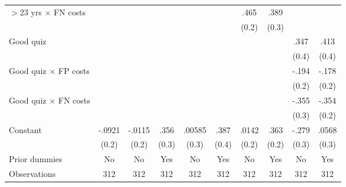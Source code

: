 \begin{table}[htbp]
\begin{tabular}{l*{9}{c}}
$>$23 yrs $\times$ FN costs&                  &                  &                  &                  &                  &     .465\sym{**} &     .389         &                  &                  \\
                &                  &                  &                  &                  &                  &    (0.2)         &    (0.3)         &                  &                  \\
Good quiz       &                  &                  &                  &                  &                  &                  &                  &     .347         &     .413         \\
                &                  &                  &                  &                  &                  &                  &                  &    (0.4)         &    (0.4)         \\
Good quiz $\times$ FP costs&                  &                  &                  &                  &                  &                  &                  &    -.194         &    -.178         \\
                &                  &                  &                  &                  &                  &                  &                  &    (0.2)         &    (0.2)         \\
Good quiz $\times$ FN costs&                  &                  &                  &                  &                  &                  &                  &    -.355         &    -.354         \\
                &                  &                  &                  &                  &                  &                  &                  &    (0.3)         &    (0.2)         \\
Constant        &   -.0921         &   -.0115         &     .356         &   .00585         &     .387         &    .0142         &     .363         &    -.279         &    .0568         \\
                &    (0.2)         &    (0.2)         &    (0.3)         &    (0.3)         &    (0.4)         &    (0.2)         &    (0.2)         &    (0.3)         &    (0.3)         \\
Prior dummies   &       No         &       No         &      Yes         &       No         &      Yes         &       No         &      Yes         &       No         &      Yes         \\
\hline
Observations    &      312         &      312         &      312         &      312         &      312         &      312         &      312         &      312         &      312         \\

\end{tabular}
\end{table}
